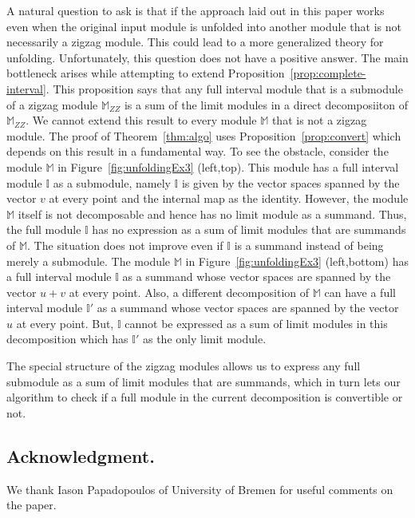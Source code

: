\documentclass[11pt]{article}
\theoremstyle{plain}%
\newcommand{\Int}{\mathbb{I}}
\newcommand{\M}{\mathbb{M}}
\begin{document}
A natural question to ask is that if the approach laid out in this paper works
even when the original input module is unfolded into another module that is
not necessarily a zigzag module. This could lead to a more generalized theory
for unfolding. Unfortunately, this question does not have a positive answer. The
main bottleneck arises while attempting to extend Proposition~\ref{prop:complete-interval}. This
proposition says that any full interval module that is a submodule of a zigzag module
$\M_{ZZ}$ is a sum of the limit modules in a direct decomposiiton of
$\M_{ZZ}$. We cannot extend this result to every module $\M$ that is not a zigzag module. The proof of Theorem~\ref{thm:algo} uses Proposition~\ref{prop:convert}
which depends on this result in a fundamental way. To see the obstacle,
consider the module $\M$ in Figure~\ref{fig:unfoldingEx3} (left,top). This module
has a full interval module $\Int$ as a submodule, namely $\Int$ is given by
the vector spaces spanned by the vector $v$ at every point and the internal map as
the identity. However, the module $\M$ itself is not decomposable and hence
has no limit module as a summand. Thus, the full module $\Int$ has no expression
as a sum of limit modules that are summands of $\M$. The situation does not
improve even if $\Int$ is a summand instead of being merely a submodule. The
module $\M$ in Figure~\ref{fig:unfoldingEx3} (left,bottom) has a full interval
module $\Int$ as a summand whose vector spaces are spanned by the vector $u+v$ at
every point. Also, a different decomposition of $\M$ can have a full interval module
$\Int'$ as a summand whose vector spaces are spanned by the vector
$u$ at every point. But, $\Int$ cannot be expressed as a sum of limit modules
in this decomposition which has $\Int'$ as the only limit module.

The special structure
of the zigzag modules allows us to express any full submodule 
as a sum of limit modules that are summands, which in turn lets our algorithm to
check if a full module in the current decomposition is convertible or not.

\subsection*{Acknowledgment.} We thank Iason Papadopoulos of University of Bremen for useful comments on the paper.

\end{document}

